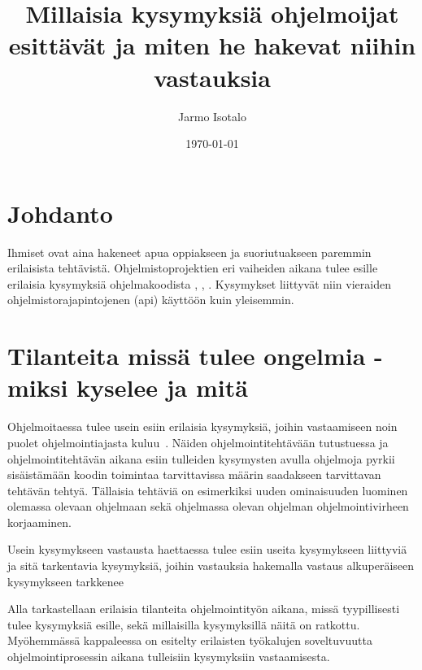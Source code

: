\documentclass[finnish]{../tktltiki2}
\title{Millaisia kysymyksiä ohjelmoijat esittävät ja miten he hakevat niihin vastauksia}
\author{Jarmo Isotalo}
\date{\today}
\theoremstyle{definition}
\theoremstyle{remark}
\begin{document}

\frontmatter      %

\maketitle        %

\tableofcontents  %


\mainmatter       %

\section{Johdanto}
Ihmiset ovat aina hakeneet apua oppiakseen ja suoriutuakseen paremmin erilaisista tehtävistä. %
Ohjelmistoprojektien eri vaiheiden aikana tulee esille erilaisia kysymyksiä ohjelmakoodista \cite{g_search_code}, \cite{questions-during-software-evolution-tasks}, \cite{asking-and-answering-api-questions}.
Kysymykset liittyvät niin vieraiden ohjelmistorajapintojenen (api) käyttöön \cite{jungloid-mining} kuin yleisemmin.

\section{Tilanteita missä tulee ongelmia - miksi kyselee ja mitä}
Ohjelmoitaessa tulee usein esiin erilaisia kysymyksiä, joihin vastaamiseen noin puolet ohjelmointiajasta kuluu~\cite{eliciting-design-requirements-for-maintenance-oriented-ides}. Näiden ohjelmointitehtävään tutustuessa ja ohjelmointitehtävän aikana esiin tulleiden kysymysten avulla ohjelmoja pyrkii sisäistämään koodin toimintaa tarvittavissa määrin saadakseen tarvittavan tehtävän tehtyä. Tällaisia tehtäviä on esimerkiksi uuden ominaisuuden luominen olemassa olevaan ohjelmaan sekä ohjelmassa olevan ohjelman ohjelmointivirheen korjaaminen.

Usein kysymykseen vastausta haettaessa tulee esiin useita kysymykseen liittyviä ja sitä tarkentavia kysymyksiä, joihin vastauksia hakemalla vastaus alkuperäiseen kysymykseen tarkkenee~\cite{questions-during-software-evolution-tasks}

Alla tarkastellaan erilaisia tilanteita ohjelmointityön aikana, missä tyypillisesti tulee kysymyksiä esille, sekä millaisilla kysymyksillä näitä on ratkottu. Myöhemmässä kappaleessa on esitelty erilaisten työkalujen soveltuvuutta ohjelmointiprosessin aikana tulleisiin kysymyksiin vastaamisesta.
\end{document}

